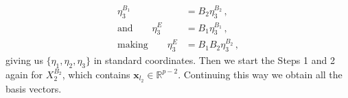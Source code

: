 \documentclass[letter,12pt]{article}
\begin{document}
{ \begin{align}\label{eq:changeOfBasis4}
      \eta_3^{B_1} & =   B_2  \eta_3^{B_2} \, , \\
    \text{and} \qquad  \eta_3^{E}  & =  B_1  \eta_3^{B_1} \, ,  \\
    \text{making} \qquad  \eta_3^{E}  & = B_1  B_2  \eta_3^{B_2} \, , 
 \end{align}
 giving us $\{\eta_1, \eta_2, \eta_3\}$ in standard coordinates. Then we start the Steps 1 and 2 again for $X_2^{B_2}$, which contains $\bm{x}_{l_2} \in \mathbb{R}^{p-2}$. Continuing this way we obtain all the basis vectors. 
}




\end{document}
